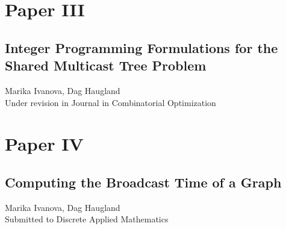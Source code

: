 \chapter*{Paper III}
\section{Integer Programming Formulations for the Shared Multicast Tree Problem}

\noindent Marika Ivanova, Dag Haugland\\

\noindent Under revision in Journal in Combinatorial Optimization
\cleardoublepage


\chapter*{Paper IV}
\section{Computing the Broadcast Time of a Graph}

\noindent Marika Ivanova, Dag Haugland\\

\noindent Submitted to Discrete Applied Mathematics
\cleardoublepage


